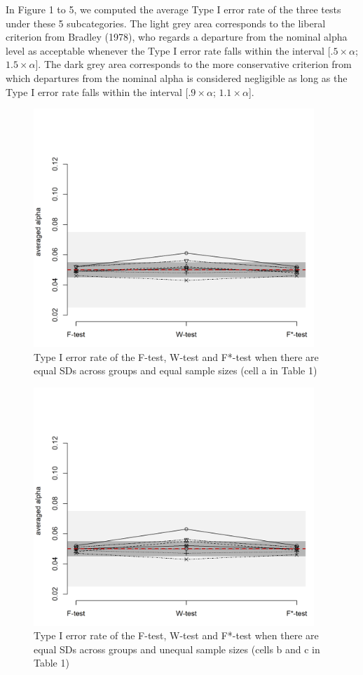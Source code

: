 \documentclass[man,floatsintext]{apa6}
\begin{document}
In Figure 1 to 5, we computed the average Type I error rate of the three tests under these 5 subcategories. The light grey area corresponds to the liberal criterion from Bradley (1978), who regards a departure from the nominal alpha level as acceptable whenever the Type I error rate falls within the interval {[}\(.5 \times \alpha\); \(1.5 \times \alpha\){]}. The dark grey area corresponds to the more conservative criterion from which departures from the nominal alpha is considered negligible as long as the Type I error rate falls within the interval {[}\(.9 \times \alpha\); \(1.1 \times \alpha\){]}.

\begin{figure}
\includegraphics[width=400px]{Rmarkdown folder/Rmarkdown inputs/Fig1A} \caption{Type I error rate of the F-test, W-test and F*-test when there are equal SDs across groups and equal sample sizes (cell a in Table 1)}\label{fig:unnamed-chunk-1}
\end{figure}

\begin{figure}
\includegraphics[width=400px]{Rmarkdown folder/Rmarkdown inputs/Fig1B} \caption{Type I error rate of the F-test, W-test and F*-test when there are equal SDs across groups and unequal sample sizes (cells b and c in Table 1)}\label{fig:unnamed-chunk-2}
\end{figure}
\end{document}
